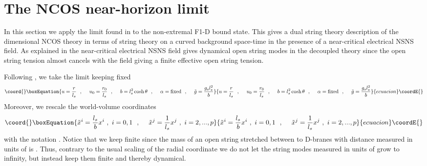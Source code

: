 \documentclass[a4paper,twoside,titlepage,12pt]{article}
\begin{document}
\section{The NCOS near-horizon limit}
\label{secNHlimit}

In this section we apply the limit found in \cite{Gopakumar:2000na} to the 
non-extremal F1-D\coordHE{} bound state.
This gives a dual string theory description of the \coordHE{} dimensional NCOS
theory in terms of string theory on a curved background space-time in the
presence of a near-critical electrical NSNS \coordHE{} field.
As explained in \cite{Seiberg:2000ms,Gopakumar:2000na} 
the near-critical electrical NSNS \coordHE{} field 
gives dynamical open string modes in the decoupled theory
since the open string tension almost cancels with the \coordHE{} field
giving a finite effective open string tension.

Following \cite{Gopakumar:2000na}, 
we take the limit \coordHE{} keeping fixed
%
\begin{equation}\coord{}\boxEquation{
\label{lim1}
u = \frac{r}{l_s} \spa
u_0 = \frac{r_0}{l_s} \spa
b = l_s^2 \cosh \theta \spa
\alpha = \mbox{fixed} \spa
\tilde{g} = \frac{g_s l_s^2}{b}
}{
u = \frac{r}{l_s} \spa
u_0 = \frac{r_0}{l_s} \spa
b = l_s^2 \cosh \theta \spa
\alpha = \mbox{fixed} \spa
\tilde{g} = \frac{g_s l_s^2}{b}
}{ecuacion}\coordE{}\end{equation}
%
Moreover, we rescale the world-volume coordinates
%
\begin{equation}\coord{}\boxEquation{
\label{lim2}
\tilde{x}^i = \frac{l_s}{b} x^i\ , \ i=0,1 \spa
\tilde{x}^j = \frac{1}{l_s} x^j\ , \ i=2,...,p
}{
\tilde{x}^i = \frac{l_s}{b} x^i\ , \ i=0,1 \spa
\tilde{x}^j = \frac{1}{l_s} x^j\ , \ i=2,...,p
}{ecuacion}\coordE{}\end{equation}
%
with the notation \coordHE{}.
Notice that we keep \coordHE{} finite since the mass of an
open string stretched between to D-branes with distance \coordHE{}
measured in units of \coordHE{} is \coordHE{}. 
Thus, contrary to the usual scaling of the radial
coordinate \coordHE{} we do not let the string modes measured in
units of \coordHE{} grow to infinity, but instead keep them finite
and thereby dynamical.
\end{document}

